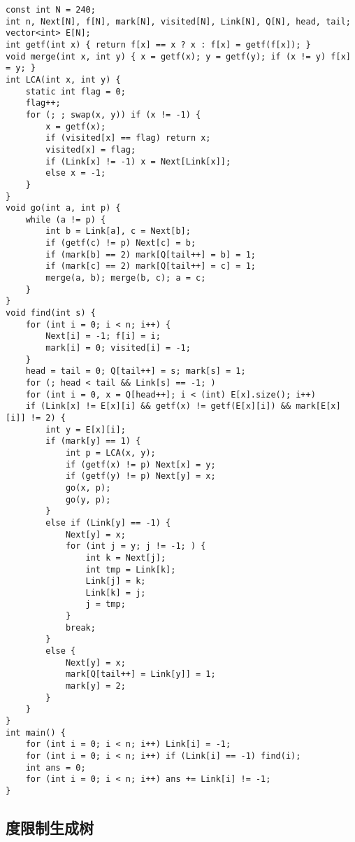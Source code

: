 \documentclass{article}
\begin{document}
\begin{lstlisting}
const int N = 240;
int n, Next[N], f[N], mark[N], visited[N], Link[N], Q[N], head, tail;
vector<int> E[N];
int getf(int x) { return f[x] == x ? x : f[x] = getf(f[x]); }
void merge(int x, int y) { x = getf(x); y = getf(y); if (x != y) f[x] = y; }
int LCA(int x, int y) {
    static int flag = 0;
    flag++;
    for (; ; swap(x, y)) if (x != -1) {
        x = getf(x);
        if (visited[x] == flag) return x;
        visited[x] = flag;
        if (Link[x] != -1) x = Next[Link[x]];
        else x = -1;
    }
}
void go(int a, int p) {
    while (a != p) {
        int b = Link[a], c = Next[b];
        if (getf(c) != p) Next[c] = b;
        if (mark[b] == 2) mark[Q[tail++] = b] = 1;
        if (mark[c] == 2) mark[Q[tail++] = c] = 1;
        merge(a, b); merge(b, c); a = c;
    }
}
void find(int s) {
    for (int i = 0; i < n; i++) {
        Next[i] = -1; f[i] = i;
        mark[i] = 0; visited[i] = -1;
    }
    head = tail = 0; Q[tail++] = s; mark[s] = 1;
    for (; head < tail && Link[s] == -1; )
    for (int i = 0, x = Q[head++]; i < (int) E[x].size(); i++)
    if (Link[x] != E[x][i] && getf(x) != getf(E[x][i]) && mark[E[x][i]] != 2) {
        int y = E[x][i];
        if (mark[y] == 1) {
            int p = LCA(x, y);
            if (getf(x) != p) Next[x] = y;
            if (getf(y) != p) Next[y] = x;
            go(x, p);
            go(y, p);
        }
        else if (Link[y] == -1) {
            Next[y] = x;
            for (int j = y; j != -1; ) {
                int k = Next[j];
                int tmp = Link[k];
                Link[j] = k;
                Link[k] = j;
                j = tmp;
            }
            break;
        }
        else {
            Next[y] = x;
            mark[Q[tail++] = Link[y]] = 1;
            mark[y] = 2;
        }
    }
}
int main() {
    for (int i = 0; i < n; i++) Link[i] = -1;
    for (int i = 0; i < n; i++) if (Link[i] == -1) find(i);
    int ans = 0;
    for (int i = 0; i < n; i++) ans += Link[i] != -1;
}
\end{lstlisting}

\subsection{度限制生成树}
\end{document}
